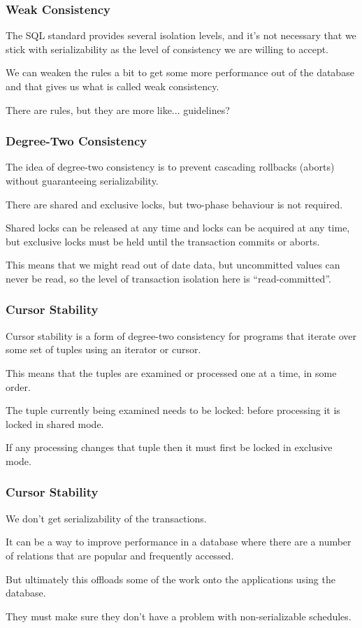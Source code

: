 \begin{frame}
\frametitle{Weak Consistency}

The SQL standard provides several isolation levels, and it's not necessary that we stick with serializability as the level of consistency we are willing to accept. 

We can weaken the rules a bit to get some more performance out of the database and that gives us what is called \alert{weak consistency}. 

There are rules, but they are more like... guidelines?

\end{frame}

\begin{frame}
\frametitle{Degree-Two Consistency}

The idea of \alert{degree-two consistency} is to prevent cascading rollbacks (aborts) without guaranteeing serializability. 

There are shared and exclusive locks, but two-phase behaviour is not required. 

Shared locks can be released at any time and locks can be acquired at any time, but exclusive locks must be held until the transaction commits or aborts. 

This means that we might read out of date data, but uncommitted values can never be read, so the level of transaction isolation here is ``read-committed''.
 
\end{frame}

\begin{frame}
\frametitle{Cursor Stability}

Cursor stability is a form of degree-two consistency for programs that iterate over some set of tuples using an iterator or cursor. 

This means that the tuples are examined or processed one at a time, in some order. 

The tuple currently being examined needs to be locked: before processing it is locked in shared mode. 

If any processing changes that tuple then it must first be locked in exclusive mode. 

\end{frame}

\begin{frame}
\frametitle{Cursor Stability}

We don't get serializability of the transactions. 

It can be a way to improve performance in a database where there are a number of relations that are popular and frequently accessed. 

But ultimately this offloads some of the work onto the applications using the database. 

They must make sure they don't have a problem with non-serializable schedules.


\end{frame}

